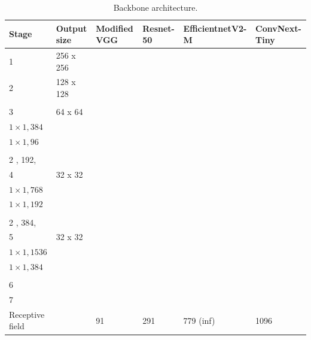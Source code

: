 \documentclass[journal]{IEEEtran}
\begin{document}
\newcommand\convnextone{
    4 \times 4, 96 \text{, s=4 } \\
}

\newcommand\convnexttwo{
    \schema{
    \schemabox{$3 \times$}
    }
    {
    \schemabox{
    $7 \times 7, 96$\\
    $1 \times 1, 384$ \\
    $1 \times 1, 96$ \\
    }
    } \\
    2 \times 2, 192, \text{ s=2}
    
}

\newcommand\convnextthree{
    \schema{
    \schemabox{$3 \times$}
    }
    {
    \schemabox{
    dw $7 \times 7, 192$\\
    $1 \times 1, 768$ \\
    $1 \times 1, 192$ \\
    }
    } \\
    2 \times 2, 384, \text{ s=2}
    
}

\newcommand\convnextfour{
    \schema{
    \schemabox{$9 \times$}
    }
    {
    \schemabox{
    dw $7 \times 7, 384$\\
    $1 \times 1, 1536$ \\
    $1 \times 1, 384$ \\
    }
    }
}

\begin{table}[]
\begin{tabular}{l|l|l|l|l|l}
Stage & Output size & Modified VGG & Resnet-50 & EfficientnetV2-M & ConvNext-Tiny \\ \hline
1     & 256 x 256   &              &     & \makecell{\effone} &               \\ \hline
2     & 128 x 128   &              & \makecell{\resone}  & \makecell{\efftwo}  & \makecell{\convnextone} \\ \hline
3     & 64 x 64     &              &           & \makecell{\effthree} & \makecell{\convnexttwo}   \\ \hline
4     & 32 x 32     &              &           & \makecell{\efffour}  & \makecell{\convnextthree}  \\ \hline
5     & 32 x 32     &              &           & \makecell{\efffive}  & \makecell{\convnextfour}   \\ \hline
6     &             &              &           &                  &               \\ \hline
7     &             &              &           &                  &                \\ \hline
Receptive field     &              & 91         & 291          & 779 (inf)           & 1096          
\end{tabular}
\caption{\label{backbone_arch} Backbone architecture.}
\end{table}
\end{document}
